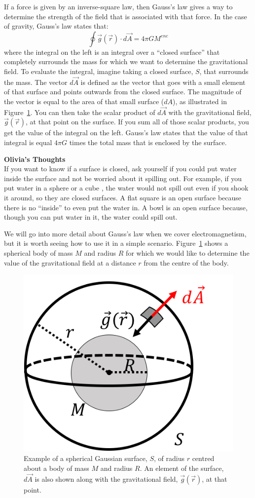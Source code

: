 If a force is given by an inverse-square law, then Gauss's law gives a way to determine the strength of the field that is associated with that force. In the case of gravity, Gauss's law states that:
\begin{equation}
\oint \vec g(\vec r) \cdot d\vec A = 4\pi G M^{enc}
\end{equation}
where the integral on the left is an integral over a ``closed surface'' that completely surrounds the mass for which we want to determine the gravitational field. To evaluate the integral, imagine taking a closed surface, $S$, that surrounds the mass. The vector $d\vec A$ is defined as the vector that goes with a small element of that surface and points outwards from the closed surface. The magnitude of the vector is equal to the area of that small surface ($dA$), as illustrated in Figure~\ref{fig:gravity:gauss}. You can then take the scalar product of $d\vec A$ with the gravitational field, $\vec g(\vec r)$, at that point on the surface. If you sum all of those scalar products, you get the value of the integral on the left. Gauss's law states that the value of that integral is equal $4 \pi G$ times the total mass that is enclosed by the surface.

\begin{framed}
\textbf{Olivia's Thoughts}\\
If you want to know if a surface is closed, ask yourself if you could put water inside the surface and not be worried about it spilling out. For example, if you put water in a sphere or a cube , the water would not spill out even if you shook it around, so they are closed surfaces. A flat square is an open surface because there is no ``inside'' to even put the water in.  A bowl is an open surface because, though you can put water in it, the water could spill out.
\end{framed}

We will go into more detail about Gauss's law when we cover electromagnetism, but it is worth seeing how to use it in a simple scenario. Figure~\ref{fig:gravity:gauss} shows a spherical body of mass $M$ and radius $R$ for which we would like to determine the value of the gravitational field at a distance $r$ from the centre of the body.

\begin{figure}[!htbp]
\centering
\includegraphics[width=0.3\linewidth]{files/gauss-532f5d1a8160ab32373485383e5e63f6.png}
\caption[]{Example of a spherical Gaussian surface, $S$, of radius $r$ centred about a body of mass $M$ and radius $R$. An element of the surface, $d\vec A$ is also shown along with the gravitational field, $\vec g(\vec r)$, at that point.}
\label{fig:gravity:gauss}
\end{figure}

